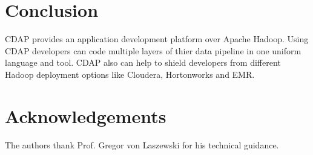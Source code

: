 \documentclass[9pt,twocolumn,twoside]{styles/osajnl}
\begin{document}
\section{Conclusion}
CDAP provides an application development platform over Apache Hadoop. Using
CDAP developers can code multiple layers of thier data pipeline in one
uniform language and tool. CDAP also can help to shield developers from
different Hadoop deployment options like Cloudera, Hortonworks and EMR.

\section*{Acknowledgements}

The authors thank Prof. Gregor von Laszewski for his technical guidance.




\end{document}

